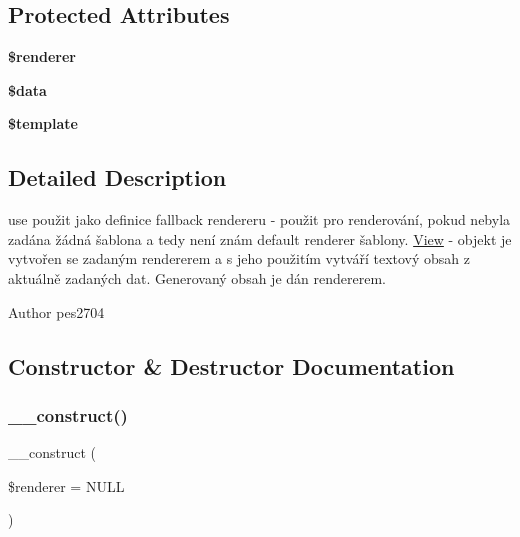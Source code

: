 \subsection*{Protected Attributes}
\begin{DoxyCompactItemize}
\item 
\mbox{\label{class_pes_1_1_view_1_1_view_a8d061cd61ab0c71fbad5286ee0928a24}} 
{\bfseries \$renderer}
\item 
\mbox{\label{class_pes_1_1_view_1_1_view_a6efc15b5a2314dd4b5aaa556a375c6d6}} 
{\bfseries \$data}
\item 
\mbox{\label{class_pes_1_1_view_1_1_view_aa3e9534005fd516d941f6a5569896e01}} 
{\bfseries \$template}
\end{DoxyCompactItemize}


\subsection{Detailed Description}
use použit jako definice fallback rendereru -\/ použit pro renderování, pokud nebyla zadána žádná šablona a tedy není znám default renderer šablony. \mbox{\hyperlink{class_pes_1_1_view_1_1_view}{View}} -\/ objekt je vytvořen se zadaným rendererem a s jeho použitím vytváří textový obsah z aktuálně zadaných dat. Generovaný obsah je dán rendererem.

\begin{DoxyAuthor}{Author}
pes2704 
\end{DoxyAuthor}


\subsection{Constructor \& Destructor Documentation}
\mbox{\label{class_pes_1_1_view_1_1_view_af62e04a1fa847074a86af330864028d3}} 
\subsubsection{\texorpdfstring{\+\_\+\+\_\+construct()}{\_\_construct()}}
{\footnotesize\ttfamily \+\_\+\+\_\+construct (\begin{DoxyParamCaption}\item[{\mbox{\hyperlink{interface_pes_1_1_view_1_1_renderer_1_1_renderer_interface}{Renderer\+Interface}}}]{\$renderer = {\ttfamily NULL} }\end{DoxyParamCaption})}

